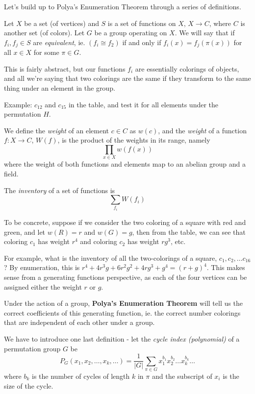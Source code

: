 \documentclass[11pt,twosided]{article}
\begin{document}
Let's build up to Polya's Enumeration Theorem through a series of definitions. 

Let $X$ be a set (of vertices) and $S$ is a set of functions on $X$, $X \rightarrow C$, where $C$ is another set (of colors). Let $G$ be a group operating on $X$. We will say that if $f_i, f_j \in S$ are \textit{equivalent}, ie. $(f_i \cong f_2)$ if and only if 
$f_i(x) = f_j(\pi(x))$ for all $x \in X$ for some $\pi \in G$. 

This is fairly abstract, but our functions $f_i$ are essentially colorings of objects, and all we're saying that two colorings are the same if they transform to the same thing under an element in the group. 

Example: $c_{12}$ and $c_{15}$ in the table, and test it for all 
elements under the permutation $H$.

We define the \textit{weight} of an element $c \in C$ as $w(c)$, and the \textit{weight} of a function $f: X \rightarrow C$, $W(f)$, is the product of the weights in its range, namely
\[
	\prod_{x \in X} w(f(x))
\]
where the weight of both functions and elements map to an abelian group and a field. 

The \textit{inventory} of a set of functions is 
\[
	\sum_{f_i} W(f_i)
\]

To be concrete, suppose if we consider the two coloring of a square with red and green, and let $w(R) = r$ and $w(G) = g$, then from the table, we can see that coloring $c_1$ has weight $r^4$ and coloring $c_2$ has weight $rg^3$, etc. 

For example, what is the inventory of all the two-colorings of a square, $c_1, c_2, \ldots c_{16}$? By enumeration, this is $r^4 + 4r^3 g + 6r^2g^2 + 4 rg^3 + g^4 = (r + g)^4$. This makes sense from a generating functions perspective, as each of the four vertices can be assigned either the weight $r$ or $g$. 

Under the action of a group, \textbf{Polya's Enumeration Theorem} will tell us the correct coefficients of this generating function, ie. the correct number colorings that are independent of each other under a group. 

We have to introduce one last definition - let the \textit{cycle index (polynomial)} of a permutation group $G$ be 
\[
	P_G(x_1, x_2, \ldots, x_k, \ldots) = \frac{1}{|G|}\sum_{\pi\in G} x_1^{b_1} x_2^{b_2} \ldots x_k^{b_k} \ldots
\]
where $b_k$ is the number of cycles of length $k$ in $\pi$ and the subscript of $x_i$ is the size of the cycle. 
\end{document}
